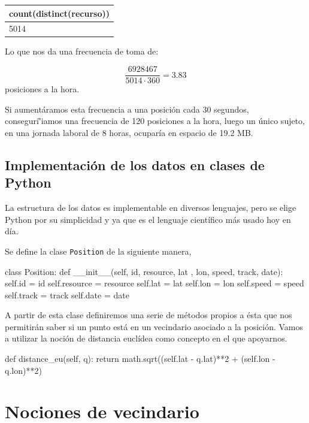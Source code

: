 \documentclass[a4paper, 12pt]{article}
\begin{document}
\begin{center}
 \begin{tabular}{|l|}
 \hline
	count(distinct(recurso)) \\
 \hline
	5014 \\
 \hline
 
 \end{tabular}
\end{center}

Lo que nos da una frecuencia de toma de:

$$ \frac{6928467}{5014 \cdot 360} = 3.83$$ posiciones a la hora.

Si aument\'aramos esta frecuencia a una posici\'on cada 30 segundos, conseguri\r'iamos una frecuencia de 120 posiciones a la hora, luego un \'unico sujeto, en una jornada laboral de 8 horas, ocupar\'ia en espacio de 19.2 MB. 

\subsection{Implementaci\'on de los datos en clases de Python}\label{sec:positionClass}

La estructura de los datos es implementable en diversos lenguajes, pero se elige Python por su simplicidad y ya que es el lenguaje cient\'ifico m\'as usado hoy en d\'ia.

Se define la clase \texttt{Position} de la siguiente manera,

\begin{python}
class Position:
    def __init__(self, id, resource, lat
    		    , lon, speed, track, date):
        self.id = id
        self.resource = resource
        self.lat = lat
        self.lon = lon
        self.speed = speed
        self.track = track
        self.date = date
\end{python}

A partir de esta clase definiremos una serie de m\'etodos propios a \'esta que nos permitir\'an saber si un punto est\'a en un vecindario asociado a la posici\'on. Vamos a utilizar la noci\'on de distancia eucl\'idea como concepto en el que apoyarnos.\\

\begin{python}
        def distance_eu(self, q):
                return math.sqrt((self.lat - q.lat)**2 
                	+ (self.lon - q.lon)**2)
\end{python}


\pagebreak
\section{Nociones de vecindario}
\end{document}
